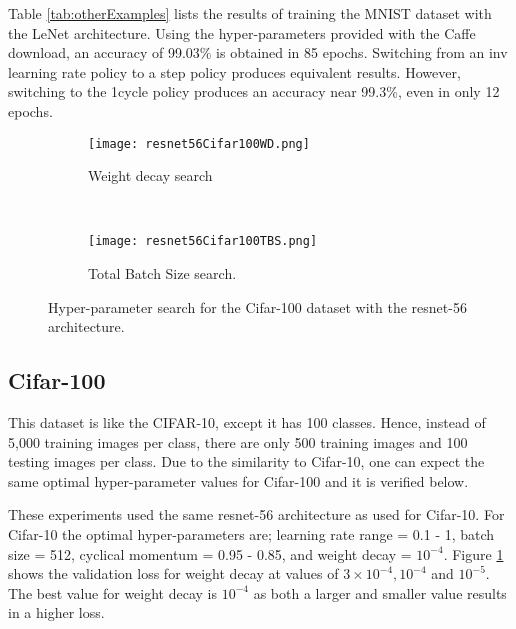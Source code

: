\documentclass{article} %
\begin{document}
Table \ref{tab:otherExamples} lists the results of training the MNIST dataset with the LeNet architecture.  Using the hyper-parameters provided with the Caffe download, an accuracy of 99.03\% is obtained in 85 epochs.  Switching from an inv learning rate policy to a step policy produces equivalent results.  However, switching to the 1cycle policy produces an accuracy near 99.3\%, even in only 12 epochs.  

\begin{figure}[tbh]
	\centering
	\begin{subfigure}[b]{0.47\textwidth}
		\texttt{[image: resnet56Cifar100WD.png]}
		\caption{Weight decay search}
		\label{fig:resnet56Cifar100WD}       %
	\end{subfigure}
	\quad
	\hfill
	~ %
	\centering
	\begin{subfigure}[b]{0.46\textwidth}
		\texttt{[image: resnet56Cifar100TBS.png]}
		\caption{Total Batch Size search.}
		\label{fig:resnet56Cifar100TBS}       %
	\end{subfigure}
	\caption{Hyper-parameter search for the Cifar-100 dataset with the resnet-56 architecture.}
	\label{fig:resnet56Cifar100}
	\vspace{-5pt}	
\end{figure}


\subsection{Cifar-100}
\label{sec:cifar100}

This dataset is like the CIFAR-10, except it has 100 classes. Hence, instead of 5,000 training images per class, there are only 500 training images and 100 testing images per class.   Due to the similarity to Cifar-10, one can expect the same optimal hyper-parameter values for Cifar-100 and it is verified below.  


These experiments used the same resnet-56 architecture as used for Cifar-10.  For Cifar-10 the optimal hyper-parameters are; learning rate range = 0.1 - 1, batch size = 512,  cyclical momentum = 0.95 - 0.85, and weight decay = $10^{-4}$.  Figure  \ref{fig:resnet56Cifar100WD} shows the validation loss for weight decay at values of  $ 3 \times 10^{-4}, 10^{-4} $ and $10^{-5} $.  The best value for  weight decay is $10^{-4}$ as both a larger and smaller value results in a higher loss.  
\end{document}
